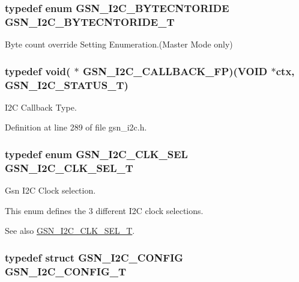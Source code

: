 \hypertarget{a00649_ga3201b324d6b787d61766a854c7a8702a}{
\subsubsection[{GSN\_\-I2C\_\-BYTECNTORIDE\_\-T}]{\setlength{\rightskip}{0pt plus 5cm}typedef enum {\bf GSN\_\-I2C\_\-BYTECNTORIDE}  {\bf GSN\_\-I2C\_\-BYTECNTORIDE\_\-T}}}
\label{a00649_ga3201b324d6b787d61766a854c7a8702a}


Byte count override Setting Enumeration.(Master Mode only) 

\hypertarget{a00649_gac8a6faecb999f4f891344abbbfc08914}{
\subsubsection[{GSN\_\-I2C\_\-CALLBACK\_\-FP}]{\setlength{\rightskip}{0pt plus 5cm}typedef void( $\ast$ {\bf GSN\_\-I2C\_\-CALLBACK\_\-FP})(VOID $\ast$ctx, {\bf GSN\_\-I2C\_\-STATUS\_\-T})}}
\label{a00649_gac8a6faecb999f4f891344abbbfc08914}


I2C Callback Type. 



Definition at line 289 of file gsn\_\-i2c.h.

\hypertarget{a00649_gaced0c2ab1bd7baab4cc105c12ccc1ce0}{
\subsubsection[{GSN\_\-I2C\_\-CLK\_\-SEL\_\-T}]{\setlength{\rightskip}{0pt plus 5cm}typedef enum {\bf GSN\_\-I2C\_\-CLK\_\-SEL} {\bf GSN\_\-I2C\_\-CLK\_\-SEL\_\-T}}}
\label{a00649_gaced0c2ab1bd7baab4cc105c12ccc1ce0}


Gsn I2C Clock selection. 

This enum defines the 3 different I2C clock selections. \begin{DoxySeeAlso}{See also}
\hyperlink{a00649_gaced0c2ab1bd7baab4cc105c12ccc1ce0}{GSN\_\-I2C\_\-CLK\_\-SEL\_\-T}. 
\end{DoxySeeAlso}
\hypertarget{a00649_ga851303f2738862fc0d0f1ea157265fec}{
\subsubsection[{GSN\_\-I2C\_\-CONFIG\_\-T}]{\setlength{\rightskip}{0pt plus 5cm}typedef struct {\bf GSN\_\-I2C\_\-CONFIG} {\bf GSN\_\-I2C\_\-CONFIG\_\-T}}}
\label{a00649_ga851303f2738862fc0d0f1ea157265fec}


